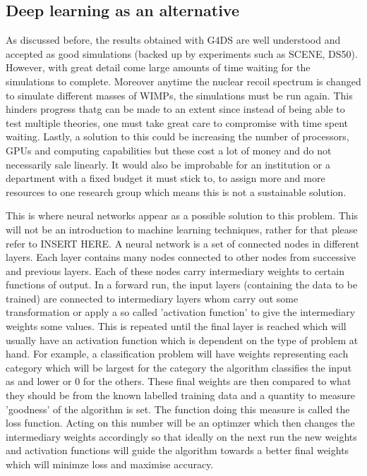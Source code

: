 \documentclass[11pt]{article} %
\begin{document}
\subsection{Deep learning as an alternative}
As discussed before, the results obtained with G4DS are well understood and accepted as good simulations (backed up by experiments such as SCENE, DS50).
However, with great detail come large amounts of time waiting for the simulations to complete.
Moreover anytime the nuclear recoil spectrum is changed to simulate different masses of WIMPs, the simulations must be run again.
This hinders progress thatg can be made to an extent since instead of being able to test multiple theories, one must take great care to compromise with time spent waiting.
Lastly, a solution to this could be increasing the number of processors, GPUs and computing capabilities but these cost a lot of money and do not necessarily sale linearly.
It would also be improbable for an institution or a department with a fixed budget it must stick to, to assign more and more resources to one research group which means this is
not a sustainable solution.
\\
\par This is where neural networks appear as a possible solution to this problem.
This will not be an introduction to machine learning techniques, rather for that please refer to INSERT HERE.
A neural network is a set of connected nodes in different layers.
Each layer contains many nodes connected to other nodes from successive and previous layers.
Each of these nodes carry intermediary weights to certain functions of output.
In a forward run, the input layers (containing the data to be trained) are connected to
intermediary layers whom carry out some transformation or apply a so called 'activation function' to give
the intermediary weights some values.
This is repeated until the final layer is reached which will usually have an activation function which is dependent on the type of problem at hand.
For example, a classification problem will have weights representing each category which will be largest for the category the algorithm classifies the input as and lower or 0 for the others.
These final weights are then compared to what they should be from the known labelled training data and a quantity to measure 'goodness' of the algorithm is set.
The function doing this measure is called the loss function.
Acting on this number will be an optimzer which then changes the intermediary weights accordingly so that ideally on the next run
the new weights and activation functions will guide the algorithm towards a better final weights which will minimze loss and maximise accuracy.
\end{document}
